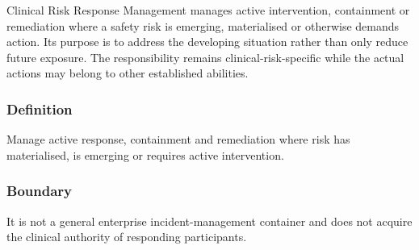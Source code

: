 Clinical Risk Response Management manages active intervention, containment or remediation where a safety risk is emerging, materialised or otherwise demands action. Its purpose is to address the developing situation rather than only reduce future exposure. The responsibility remains clinical-risk-specific while the actual actions may belong to other established abilities.

\subsubsection*{Definition}

Manage active response, containment and remediation where risk has materialised, is emerging or requires active intervention.

\subsubsection*{Boundary}

It is not a general enterprise incident-management container and does not acquire the clinical authority of responding participants.

